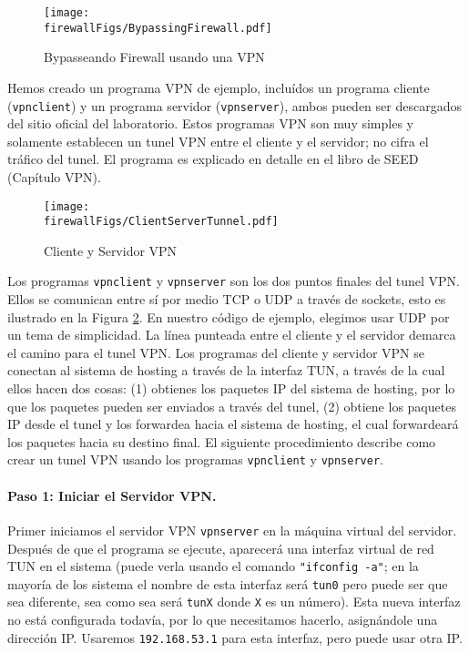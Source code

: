 \begin{figure}[htb]
\begin{center}
\texttt{[image: \\firewallFigs/BypassingFirewall.pdf]}
\end{center}
\caption{Bypasseando Firewall usando una VPN}
\label{vpn_firewall:fig:bypassing}
\end{figure}
 
Hemos creado un programa VPN de ejemplo, incluídos un programa cliente (\texttt{vpnclient}) y un programa servidor (\texttt{vpnserver}), ambos pueden ser descargados del sitio oficial del laboratorio. Estos programas VPN son muy simples y solamente establecen un tunel VPN entre el cliente y el servidor; no cifra el tráfico del tunel.
El programa es explicado en detalle en el libro de SEED (Capítulo VPN).


\begin{figure}[htb]
\begin{center}
\texttt{[image: \\firewallFigs/ClientServerTunnel.pdf]}
\end{center}
\caption{Cliente y Servidor VPN}
\label{vpn_firewall:fig:client_server}
\end{figure}

Los programas \texttt{vpnclient} y \texttt{vpnserver} son los dos puntos finales del tunel VPN. Ellos se comunican entre sí por medio TCP o UDP a través de sockets, esto es ilustrado en la Figura \ref{vpn_firewall:fig:client_server}. En nuestro código de ejemplo, elegimos usar UDP por un tema de simplicidad. La línea punteada entre el cliente y el servidor demarca el camino para el tunel VPN.
Los programas del cliente y servidor VPN se conectan al sistema de hosting a través de la interfaz TUN, a través de la cual ellos hacen dos cosas: (1) obtienes los paquetes IP del sistema de hosting, por lo que los paquetes pueden ser enviados a través del tunel, (2) obtiene los paquetes IP desde el tunel y los forwardea hacia el sistema de hosting, el cual forwardeará los paquetes hacia su destino final.
El siguiente procedimiento describe como crear un tunel VPN usando los programas \texttt{vpnclient} y \texttt{vpnserver}.


\paragraph{Paso 1: Iniciar el Servidor VPN.}
Primer iniciamos el servidor VPN \texttt{vpnserver} en la máquina virtual del servidor.
Después de que el programa se ejecute, aparecerá una interfaz virtual de red TUN en el sistema (puede verla usando el comando \texttt{"ifconfig -a"}; en la mayoría de los sistema el nombre de esta interfaz será \texttt{tun0} pero puede ser que sea diferente, sea como sea será \texttt{tunX} donde \texttt{X} es un número).
Esta nueva interfaz no está configurada todavía, por lo que necesitamos hacerlo, asignándole una dirección IP. Usaremos \texttt{192.168.53.1} para esta interfaz, pero puede usar otra IP.

